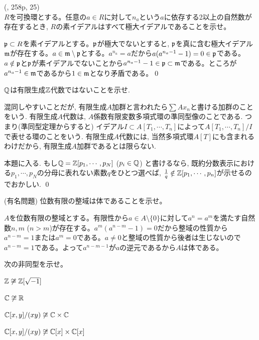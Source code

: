 \begin{egprob} (\cite{dummit}, 258p, 25)\\
$R$を可換環とする。任意の$a\in R$に対して$n_{a}$という$a$に依存する2以上の自然数が存在するとき, $R$の素イデアルはすべて極大イデアルであることを示せ。
\end{egprob}
\begin{egans}
$\mathfrak{p}\subset R$を素イデアルとする。$\mathfrak{p}$が極大でないとすると, $\mathfrak{p}$を真に含む極大イデアル$\mathfrak{m}$が存在する。$a\in \mathfrak{m}\setminus{\mathfrak{p}}$とする。$a^{n_{a}} = a$だから$a(a^{n_{a} - 1} - 1)=0\in \mathfrak{p}$である。$a\notin \mathfrak{p}$と$\mathfrak{p}$が素イデアルでないことから$a^{n_{a}-1}-1\in \mathfrak{p}\subset \mathfrak{m}$である。ところが$a^{n_{a}-1}\in \mathfrak{m}$であるから$1\in \mathfrak{m}$となり矛盾である。\qed
\end{egans}

\begin{egprob} \label{egprob:Q_is_not_finitelygenerated_over_Z}
$\mathbb{Q}$は有限生成$\mathbb{Z}$代数ではないことを示せ.
\end{egprob}
\begin{egans}
混同しやすいことだが, 有限生成$A$加群と言われたら$\sum Ax_n$と書ける加群のことをいう. 有限生成$A$代数は, $A$係数有限変数多項式環の準同型像のことである. つまり(準同型定理からすると) イデアル$I\subset A[T_1,\cdots, T_n]$によって$A[T_1,\cdots,T_n]/I$で表せる環のことをいう. 有限生成$A$代数には, 当然多項式環$A[T]$にも含まれるわけだから, 有限生成$A$加群であるとは限らない.  \par
本題に入る. もし$\mathbb{Q} = \mathbb{Z}[p_1,\cdots, p_N]$ ($p_i\in \mathbb{Q}$) と書けるなら, 既約分数表示における$p_1,\cdots, p_N$の分母に表れない素数$q$をひとつ選べば, $\frac{1}{q} \notin \mathbb{Z}[p_1,\cdots, p_n]$が示せるのでおかしい. \qed
\end{egans}

\begin{egprob} (有名問題)
位数有限の整域は体であることを示せ。
\end{egprob}
\begin{egans}
$A$を位数有限の整域とする。有限性から$a\in A\setminus{\{ 0 \}}$に対して$a^{n} = a^{m}$を満たす自然数$n,m$ ($n>m$)が存在する。$a^{m}(a^{n-m} - 1) = 0$だから整域の性質から$a^{n-m} = 1$または$a^{m} = 0$である。$a\neq 0$と整域の性質から後者は生じないので$a^{n-m} = 1$である。よって$a^{n-m-1}$が$a$の逆元であるから$A$は体である。
\end{egans}


\begin{egprob}
次の非同型を示せ。
\ben
\item $\mathbb{Z}\not \cong \mathbb{Z}[\sqrt{-1}]$
\item $\mathbb{C}\not \cong \mathbb{R}$
\item $\mathbb{C}[x,y]/(xy)\not\cong \mathbb{C}\times \mathbb{C}$
\item $\mathbb{C}[x,y]/(xy)\not\cong \mathbb{C}[x]\times\mathbb{C}[x]$
\een
\end{egprob}


